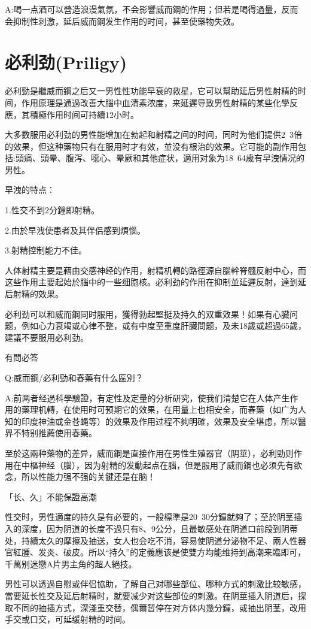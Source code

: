 \documentclass[12pt,UTF8]{ctexbook}
\begin{document}
A:喝一点酒可以營造浪漫氣氛，不会影響威而鋼的作用；但若是喝得過量，反而会抑制性刺激，延后威而鋼发生作用的时间，甚至使藥物失效。

\section{必利劲(Priligy)}

必利勁是繼威而鋼之后又一男性性功能早衰的救星，它可以幫助延后男性射精的时间，作用原理是通過改善大腦中血清素浓度，来延遲导致男性射精的某些化學反應，其積極作用时间可持續12小时。

大多数服用必利劲的男性能增加在勃起和射精之间的时间，同时为他们提供2~3倍的效果，但这种藥物只有在服用时才有效，並没有根治的效果。它可能的副作用包括:頭痛、頭晕、腹泻、噁心、晕厥和其他症状，適用对象为18~64歲有早洩情况的男性。

早洩的特点：

1.性交不到2分鐘即射精。

2.由於早洩使患者及其伴侣感到煩惱。

3.射精控制能力不佳。

人体射精主要是藉由交感神经的作用，射精机轉的路徑源自腦幹脊髓反射中心，而这些作用主要起始於腦中的一些细胞核。必利劲的作用在抑制並延遲反射，達到延后射精的效果。

必利劲可以和威而鋼同时服用，獲得勃起堅挺及持久的双重效果！如果有心臓问题，例如心力衰竭或心律不整，或有中度至重度肝臟問题，及未18歲或超過65歲，建議不要服用必利劲。

有問必答

Q:威而鋼/必利勁和春藥有什么區別？

A:前两者经過科學驗證，有定性及定量的分析研究，使我们清楚它在人体产生作用的藥理机轉，在使用时可预期它的效果，在用量上也相安全，而春藥（如广为人知的印度神油或金苍蝇等）的效果及作用过程不夠明確，效果及安全堪虑，所以醫界不特别推薦使用春藥。

至於这兩种藥物的差异，威而鋼是直接作用在男性生殖器官（阴莖），必利勁则作用在中樞神经（腦），因为射精的发動起点在腦，但是服用了威而鋼也必须先有欲念，所以性能力强不强的关鍵还是在脑！

「长、久」不能保證高潮

性交时，男性適度的持久是有必要的，一般標準是20~30分鐘就夠了；至於阴茎插入的深度，因为阴道的长度不過只有8、9公分，且最敏感处在阴道口前段到阴蒂处，持續太久的摩擦及抽送，女人也会吃不消，容易使阴道分泌物不足、兩人性器官紅腫、发炎、破皮。所以“持久”的定義應该是使雙方均能维持到高潮来臨即可，千萬别迷戀A片男主角的超人絕技。

男性可以透過自慰或伴侣協助，了解自己对哪些部位、哪种方式的刺激比较敏感，當要延长性交及延后射精时，就要减少对这些部位的刺激。在阴莖插入阴道后，探取不同的抽插方式，深淺重交替，偶爾暂停在对方体内幾分鐘，或抽出阴茎，改用手交或口交，可延缓射精的时间。
\end{document}
